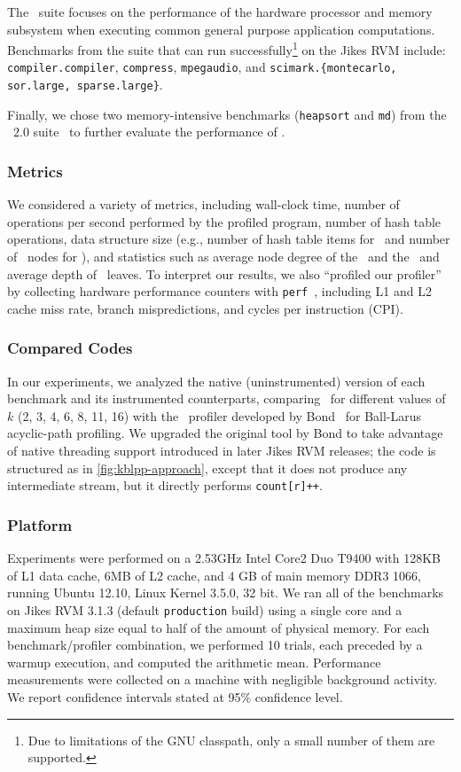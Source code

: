 The \specjvm\ suite focuses on the performance of the hardware processor and memory subsystem when executing common general purpose application computations. Benchmarks from the suite that can run successfully\footnote{Due to limitations of the GNU classpath, only a small number of them are supported.} on the Jikes RVM include: {\tt compiler.compiler}, {\tt compress}, {\tt mpegaudio}, and {\tt scimark.\{montecarlo, sor.large, sparse.large\}}.

Finally, we chose two memory-intensive benchmarks ({\tt heapsort} and {\tt md}) from the \javagrande\ $2.0$ suite~\cite{Bull99} to further evaluate the performance of \kblpp.

\subsubsection*{Metrics}
We considered a variety of metrics, including wall-clock time, number of operations per second performed by the profiled program, number of hash table operations, data structure size (e.g., number of hash table items for \blpp\ and number of \ksf\ nodes for \kblpp), and statistics such as average node degree of the \ksf\ and the \kipf\ and average depth of \kipf\ leaves. To interpret our results, we also ``profiled our profiler'' by collecting hardware performance counters with {\tt perf}~\cite{perf}, including L1 and L2 cache miss rate, branch mispredictions, and cycles per instruction (CPI).

\subsubsection*{Compared Codes}
In our experiments, we analyzed the native (uninstrumented) version of each benchmark and its instrumented counterparts, comparing \kblpp\ for different values of $k$ (2, 3, 4, 6, 8, 11, 16) with the \blpp\ profiler developed by Bond~\cite{PEP} for Ball-Larus acyclic-path profiling. We upgraded the original tool by Bond to take advantage of native threading support introduced in later Jikes RVM releases; the code is structured as in \myfigure\ref{fig:kblpp-approach}, except that it does not produce any intermediate stream, but it directly performs {\tt count[r]++}.

\subsubsection*{Platform}
Experiments were performed on a 2.53GHz Intel Core2 Duo T9400 with 128KB of L1 data cache, 6MB of L2 cache, and 4 GB of main memory DDR3 1066, running Ubuntu 12.10, Linux Kernel 3.5.0, 32 bit. We ran all of the benchmarks on Jikes RVM 3.1.3 (default {\tt production} build) using a single core and a maximum heap size equal to half of the amount of physical memory. For each benchmark/profiler combination, we performed 10 trials, each preceded by a warmup execution, and computed the arithmetic mean. Performance measurements were collected on a machine with negligible background activity. We report confidence intervals stated at 95\% confidence level.

